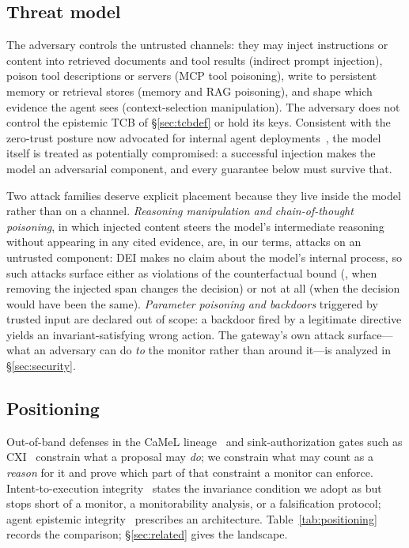 \subsection{Threat model}
\label{sec:threat}
The adversary controls the untrusted channels: they may inject
instructions or content into retrieved documents and tool results
(indirect prompt injection), poison tool descriptions or servers (MCP
tool poisoning), write to persistent memory or retrieval stores
(memory and RAG poisoning), and shape which evidence the agent sees
(context-selection manipulation). The adversary does not control the
epistemic TCB of \S\ref{sec:tcbdef} or hold its keys. Consistent with
the zero-trust posture now advocated for internal agent
deployments~\cite{controlroadmap}, the model itself is treated as
potentially compromised: a successful injection makes the model an
adversarial component, and every guarantee below must survive that.

Two attack families deserve explicit placement because they live inside
the model rather than on a channel. \emph{Reasoning manipulation and
chain-of-thought poisoning}, in which injected content steers the
model's intermediate reasoning without appearing in any cited evidence,
are, in our terms, attacks on an untrusted component: DEI makes no claim
about the model's internal process, so such attacks surface either as
violations of the counterfactual bound (\Ifive, when removing the
injected span changes the decision) or not at all (when the decision
would have been the same). \emph{Parameter poisoning and backdoors}
triggered by trusted input are declared out of scope: a backdoor fired
by a legitimate directive yields an invariant-satisfying wrong action.
The gateway's own attack surface---what an adversary can do \emph{to}
the monitor rather than around it---is analyzed in \S\ref{sec:security}.

\subsection{Positioning}
\label{sec:positioning}
Out-of-band defenses in the CaMeL lineage~\cite{camel,oob} and
sink-authorization gates such as CXI~\cite{cxi} constrain what a
proposal may \emph{do}; we constrain what may count as a \emph{reason}
for it and prove which part of that constraint a monitor can enforce.
Intent-to-execution integrity~\cite{qu} states the invariance
condition we adopt as \Ifive{} but stops short of a monitor, a
monitorability analysis, or a falsification protocol; agent epistemic
integrity~\cite{shen} prescribes an architecture. Table~\ref{tab:positioning}
records the comparison; \S\ref{sec:related} gives the landscape.

